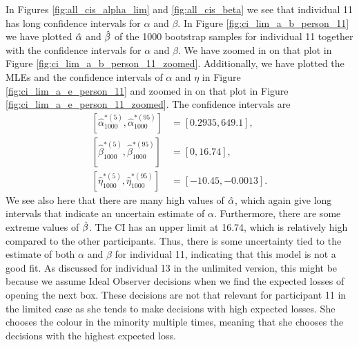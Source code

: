 In Figures \ref{fig:all_cis_alpha_lim} and \ref{fig:all_cis_beta} we see that individual 11 has long confidence intervals for $\alpha$ and $\beta$. In Figure \ref{fig:ci_lim_a_b_person_11} we have plotted $\hat{\alpha}$ and $\hat{\beta}$ of the 1000 bootstrap samples for individual 11 together with the confidence intervals for $\alpha$ and $\beta$.
We have zoomed in on that plot in Figure \ref{fig:ci_lim_a_b_person_11_zoomed}. Additionally, we have plotted the MLEs and the confidence intervals of $\alpha$ and $\eta$ in Figure \ref{fig:ci_lim_a_e_person_11} and zoomed in on that plot in Figure \ref{fig:ci_lim_a_e_person_11_zoomed}.
The confidence intervals are 
\begin{equation*}
    \begin{aligned}
         \left[ \hat{\alpha}^{*(5)}_{1000},\hat{\alpha}^{*(95)}_{1000}\right] &= [0.2935,649.1],\\
         \left[\hat{\beta}^{*(5)}_{1000},\hat{\beta}^{*(95)}_{1000}\right] &= [0,16.74],\\
         \left[\hat{\eta}^{*(5)}_{1000},\hat{\eta}^{*(95)}_{1000}\right] &= [-10.45,-0.0013].
    \end{aligned}
\end{equation*}
We see also here that there are many high values of $\hat{\alpha}$, which again give long intervals that indicate an uncertain estimate of $\alpha$. Furthermore, there are some extreme values of $\hat{\beta}$. The CI has an upper limit at 16.74, which is relatively high compared to the other participants. Thus, there is some uncertainty tied to the estimate of both $\alpha$ and $\beta$ for individual 11, indicating that this model is not a good fit. As discussed for individual 13 in the unlimited version, this might be because we assume Ideal Observer decisions when we find the expected losses of opening the next box. These decisions are not that relevant for participant 11 in the limited case as she tends to make decisions with high expected losses. She chooses the colour in the minority multiple times, meaning that she chooses the decisions with the highest expected loss. 
